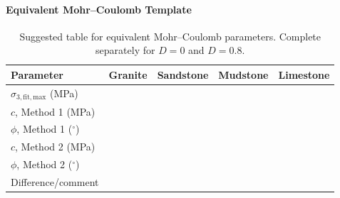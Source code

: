 \paragraph{Equivalent Mohr--Coulomb Template}

\begin{table}[H]
\centering
\small
\begin{tabularx}{0.95\textwidth}{l c c c c}
\toprule
\textbf{Parameter} & \textbf{Granite} & \textbf{Sandstone} & \textbf{Mudstone} & \textbf{Limestone} \\
\midrule
\(\sigma_{3,\mathrm{fit,max}}\) (MPa) & & & & \\
\(c\), Method 1 (MPa) & & & & \\
\(\phi\), Method 1 (\(^\circ\)) & & & & \\
\(c\), Method 2 (MPa) & & & & \\
\(\phi\), Method 2 (\(^\circ\)) & & & & \\
Difference/comment & & & & \\
\bottomrule
\end{tabularx}
\caption{Suggested table for equivalent Mohr--Coulomb parameters. Complete separately for \(D=0\) and \(D=0.8\).}
\label{tab:mc_template}
\end{table}

